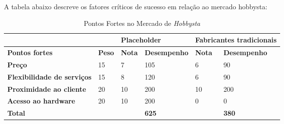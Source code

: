 A tabela abaixo descreve os fatores críticos de sucesso em relação ao mercado hobbysta:

\begin{table}[!htbp]
	\centering

	\begin{tabular}{ll|l|l|l|l|}
		\cline{3-6}
		&      & \multicolumn{2}{l|}{\textbf{Placeholder}} & \multicolumn{2}{l|}{\textbf{Fabricantes tradicionais}} \\ \hline
		\multicolumn{1}{|l|}{\textbf{Pontos fortes}}             & \textbf{Peso} & \textbf{Nota}         & \textbf{Desempenho}        & \textbf{Nota}               & \textbf{Desempenho}               \\ \hline
		\multicolumn{1}{|l|}{\textbf{Preço}}                     & 15   & 7            & 105               & 6                  & 90                      \\ \hline
		\multicolumn{1}{|l|}{\textbf{Flexibilidade de serviços}} & 15   & 8            & 120               & 6                  & 90                      \\ \hline
		\multicolumn{1}{|l|}{\textbf{Proximidade ao cliente}}    & 20   & 10           & 200               & 10                 & 200                      \\ \hline
		\multicolumn{1}{|l|}{\textbf{Acesso ao hardware}}        & 20   & 10           & 200               & 0                  & 0                       \\ \hline
		\multicolumn{1}{|l|}{\textbf{Total}}                     &      &              & \textbf{625}               &                    & \textbf{380}                      \\ \hline
	\end{tabular}
	\label{pontoForteHobby}
	\caption{Pontos Fortes no Mercado de \emph{Hobbysta}}
\end{table}

